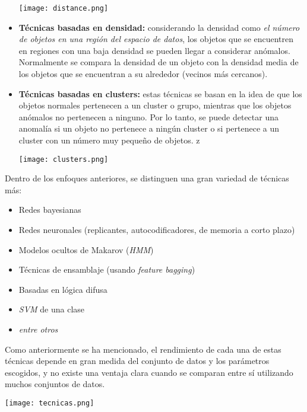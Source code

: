 \begin{itemize}[topsep=0pt]
		\begin{minipage}{\linewidth}
			\centering
			\texttt{[image: distance.png]}
			\label{fig:fig4}
		\end{minipage}
	\item \textbf{Técnicas basadas en densidad:} considerando la densidad como \emph{el número de
		objetos en una región del espacio de datos}, los objetos que se encuentren en regiones
		con una baja densidad se pueden llegar a considerar anómalos. Normalmente se compara la
		densidad de un objeto con la densidad media de los objetos que se encuentran a su alrededor
		(vecinos más cercanos).
	\item \textbf{Técnicas basadas en clusters:} estas técnicas se basan en la idea de que los
		objetos normales pertenecen a un cluster o grupo, mientras que los objetos anómalos no
		pertenecen a ninguno. Por lo tanto, se puede detectar una anomalía si un objeto no pertenece
		a ningún cluster o si pertenece a un cluster con un número muy pequeño de objetos.
		\vspace{1\baselineskip} z

		\begin{minipage}{\linewidth}
			\centering
			\texttt{[image: clusters.png]}
			\label{fig:fig5}
		\end{minipage}
\end{itemize}

Dentro de los enfoques anteriores, se distinguen una gran variedad de técnicas más:
\begin{itemize}[noitemsep,topsep=0pt]
	\item Redes bayesianas
	\item Redes neuronales (replicantes, autocodificadores, de memoria a corto plazo)
	\item Modelos ocultos de Makarov (\textit{HMM})
	\item Técnicas de ensamblaje (usando \textit{feature bagging})
	\item Basadas en lógica difusa
	\item \textit{SVM} de una clase
	\item \textit{entre otros}
\end{itemize}

Como anteriormente se ha mencionado, el rendimiento de cada una de estas técnicas depende
en gran medida del conjunto de datos y los parámetros escogidos, y no existe una ventaja
clara cuando se comparan entre sí utilizando muchos conjuntos de datos.~\cite{chandola2009anomaly}

\begin{minipage}{\linewidth}
	\centering
	\texttt{[image: tecnicas.png]}
	\label{fig:fig8}
\end{minipage}
